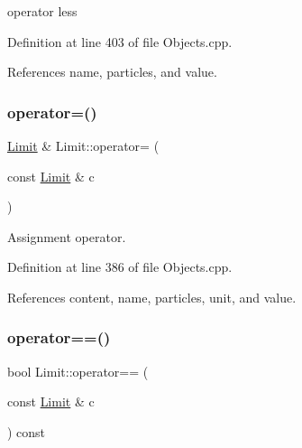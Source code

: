 operator less 



Definition at line 403 of file Objects.\+cpp.



References name, particles, and value.

\hypertarget{class_d_d4hep_1_1_geometry_1_1_limit_a552afa647ac82252e601c3cd02d41e21}{}\label{class_d_d4hep_1_1_geometry_1_1_limit_a552afa647ac82252e601c3cd02d41e21} 
\subsubsection{\texorpdfstring{operator=()}{operator=()}}
{\footnotesize\ttfamily \hyperlink{class_d_d4hep_1_1_geometry_1_1_limit}{Limit} \& Limit\+::operator= (\begin{DoxyParamCaption}\item[{const \hyperlink{class_d_d4hep_1_1_geometry_1_1_limit}{Limit} \&}]{c }\end{DoxyParamCaption})}



Assignment operator. 



Definition at line 386 of file Objects.\+cpp.



References content, name, particles, unit, and value.

\hypertarget{class_d_d4hep_1_1_geometry_1_1_limit_a2b3bc1de601d03a27e58e8ca19cb8012}{}\label{class_d_d4hep_1_1_geometry_1_1_limit_a2b3bc1de601d03a27e58e8ca19cb8012} 
\subsubsection{\texorpdfstring{operator==()}{operator==()}}
{\footnotesize\ttfamily bool Limit\+::operator== (\begin{DoxyParamCaption}\item[{const \hyperlink{class_d_d4hep_1_1_geometry_1_1_limit}{Limit} \&}]{c }\end{DoxyParamCaption}) const}



